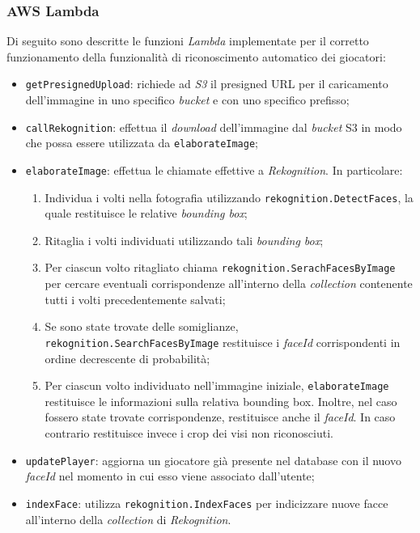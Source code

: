 	\subsubsection{AWS Lambda}
	Di seguito sono descritte le funzioni \emph{Lambda} implementate per il corretto funzionamento della funzionalità di riconoscimento automatico dei giocatori:
	\begin{itemize}
		\item \texttt{getPresignedUpload}: richiede ad \emph{S3} il presigned URL per il caricamento dell'immagine in uno specifico \emph{bucket} e con uno specifico prefisso;
		\item \texttt{callRekognition}: effettua il \emph{download} dell'immagine dal \emph{bucket} S3 in modo che possa essere utilizzata da \texttt{elaborateImage};
		\item \texttt{elaborateImage}: effettua le chiamate effettive a \emph{Rekognition}. In particolare:
			\begin{enumerate}
				\item Individua i volti nella fotografia utilizzando \texttt{rekognition.DetectFaces}, la quale restituisce le relative \emph{bounding box};
				\item Ritaglia i volti individuati utilizzando tali \emph{bounding box};
				\item Per ciascun volto ritagliato chiama \texttt{rekognition.SerachFacesByImage} per cercare eventuali corrispondenze all'interno della \emph{collection} contenente tutti i volti precedentemente salvati;
				\item Se sono state trovate delle somiglianze, \texttt{rekognition.SearchFacesByImage} restituisce i \emph{faceId} corrispondenti in ordine decrescente di probabilità;
				\item Per ciascun volto individuato nell'immagine iniziale, \texttt{elaborateImage} restituisce le informazioni sulla relativa bounding box. Inoltre, nel caso fossero state trovate corrispondenze, restituisce anche il \emph{faceId}. In caso contrario restituisce invece i crop dei visi non riconosciuti.
			\end{enumerate}
		\item \texttt{updatePlayer}: aggiorna un giocatore già presente nel database con il nuovo \emph{faceId} nel momento in cui esso viene associato dall'utente;
		\item \texttt{indexFace}: utilizza \texttt{rekognition.IndexFaces} per indicizzare nuove facce all'interno della \emph{collection} di \emph{Rekognition}.
	\end{itemize}
	

